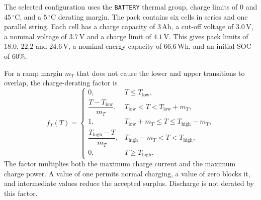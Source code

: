 \begin{samepage}
The selected configuration uses the \texttt{BATTERY} thermal group, charge
limits of \(0\) and \(45\,^{\circ}\mathrm{C}\), and a \(5\,^{\circ}\mathrm{C}\)
derating margin. The pack contains six cells in series and one parallel string.
Each cell has a charge capacity of \(3\,\mathrm{Ah}\), a cut-off voltage of
\(3.0\,\mathrm{V}\), a nominal voltage of \(3.7\,\mathrm{V}\) and a charge
limit of \(4.1\,\mathrm{V}\). This gives pack limits of \(18.0\), \(22.2\)
and \(24.6\,\mathrm{V}\), a nominal energy capacity of \(66.6\,\mathrm{Wh}\),
and an initial SOC of \(60\%\).

For a ramp margin $m_T$ that does not cause the lower and upper transitions to
overlap, the charge-derating factor is
\begin{equation}
    f_T(T)
    =
    \begin{cases}
        0,
        & T\leq T_{\mathrm{low}},
        \\[0.35em]
        \dfrac{T-T_{\mathrm{low}}}{m_T},
        & T_{\mathrm{low}}<T<T_{\mathrm{low}}+m_T,
        \\[0.9em]
        1,
        & T_{\mathrm{low}}+m_T
          \leq T\leq
          T_{\mathrm{high}}-m_T,
        \\[0.35em]
        \dfrac{T_{\mathrm{high}}-T}{m_T},
        & T_{\mathrm{high}}-m_T<T<T_{\mathrm{high}},
        \\[0.9em]
        0,
        & T\geq T_{\mathrm{high}}.
    \end{cases}
    \label{eq:battery_charge_derating_ch8}
\end{equation}
The factor multiplies both the maximum charge current and the maximum charge
power. A value of one permits normal charging, a value of zero blocks it, and
intermediate values reduce the accepted surplus. Discharge is not derated by
this factor.
\end{samepage}

